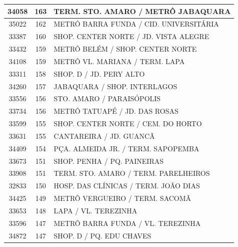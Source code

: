 \documentclass[
	12pt,				%
	oneside,			%
	a4paper,			%
	english,			%
	brazil				%
	]{abntex2ppgsi}
\begin{document}
\begin{apendicesenv}
\begin{longtable}{c|c|p{7cm}}
    34058 & 163   & TERM. STO. AMARO / METRÔ JABAQUARA \\
\hline

    35022 & 162   & METRÔ BARRA FUNDA / CID. UNIVERSITÁRIA \\
\hline

    33387 & 160   & SHOP. CENTER NORTE / JD. VISTA ALEGRE \\
\hline

    33432 & 159   & METRÔ BELÉM / SHOP. CENTER NORTE \\
\hline

    34108 & 159   & METRÔ VL. MARIANA / TERM. LAPA \\
\hline

    33311 & 158   & SHOP. D / JD. PERY ALTO \\
\hline

    34260 & 157   & JABAQUARA / SHOP. INTERLAGOS \\
\hline

    33556 & 156   & STO. AMARO / PARAISÓPOLIS \\
\hline

    33734 & 156   & METRÔ TATUAPÉ / JD. DAS ROSAS \\
\hline

    33599 & 155   & SHOP. CENTER NORTE / CEM. DO HORTO \\
\hline

    33631 & 155   & CANTAREIRA / JD. GUANCÃ \\
\hline

    34409 & 154   & PÇA. ALMEIDA JR. / TERM. SAPOPEMBA \\
\hline

    33673 & 151   & SHOP. PENHA / PQ. PAINEIRAS \\
\hline

    33908 & 151   & TERM. STO. AMARO / TERM. PARELHEIROS \\
\hline

    32833 & 150   & HOSP. DAS CLÍNICAS / TERM. JOÃO DIAS \\
\hline

    34425 & 149   & METRÔ VERGUEIRO / TERM. SACOMÃ \\
\hline

    33653 & 148   & LAPA / VL. TEREZINHA \\
\hline

    33596 & 147   & METRÔ BARRA FUNDA / VL. TEREZINHA \\
\hline

    34872 & 147   & SHOP. D / PQ. EDU CHAVES \\
\hline


\end{longtable}
\end{apendicesenv}
\end{document}
